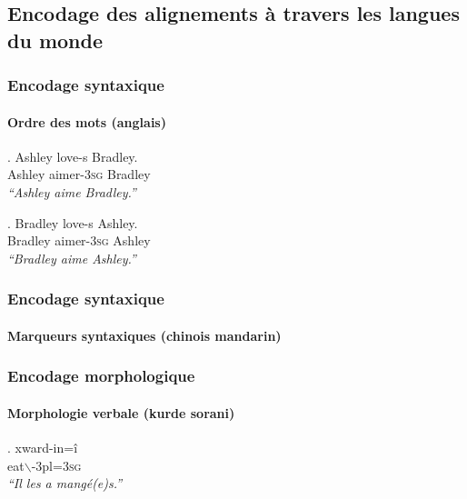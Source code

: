 \subsection[Encodage des alignements]{Encodage des alignements à travers les langues du monde}

\begin{frame}
\frametitle{Encodage syntaxique}
\framesubtitle{Ordre des mots (anglais)}

\ex. Ashley love-s Bradley.\\
Ashley aimer\textsc{-3sg} Bradley\\
{\em ``Ashley aime Bradley.''}

\ex. Bradley love-s Ashley.\\
Bradley aimer\textsc{-3sg} Ashley\\
{\em ``Bradley aime Ashley.''}

\end{frame}

\begin{frame}
\frametitle{Encodage syntaxique}
\framesubtitle{Marqueurs syntaxiques (chinois mandarin)}




\end{frame}



\begin{frame}
\frametitle{Encodage morphologique}
\framesubtitle{Morphologie verbale (kurde sorani)}

\ex. xward-in\alert{=î} \\
eat$\backslash$\sii-{\sc 3pl}=\textsc{3sg}\\
{\em ``Il les a mangé(e)s.''}

\end{frame}

